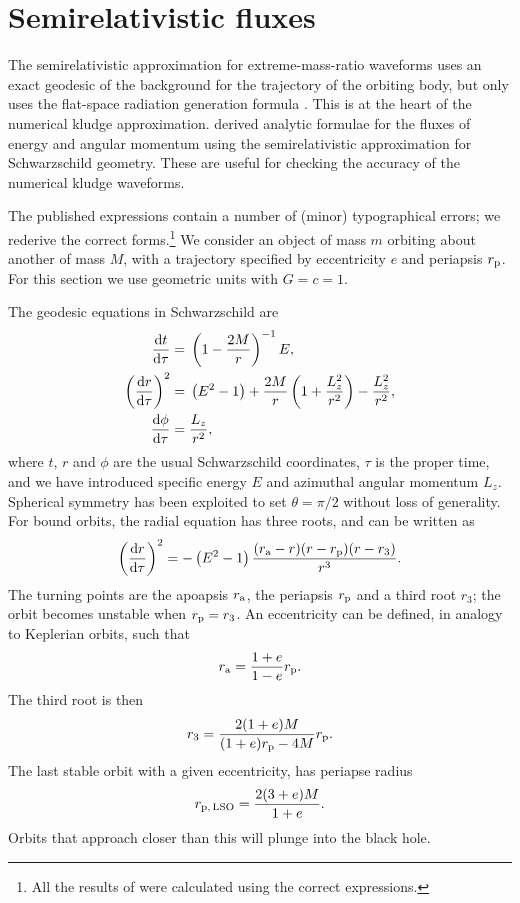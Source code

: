 \chapter{Semirelativistic fluxes}\label{ap:energy}

The semirelativistic approximation for extreme-mass-ratio waveforms uses an exact geodesic of the background for the trajectory of the orbiting body, but only uses the flat-space radiation generation formula \citep{Ruffini1981}. This is at the heart of the numerical kludge approximation. \citet{Gair2005} derived analytic formulae for the fluxes of energy and angular momentum using the semirelativistic approximation for Schwarzschild geometry. These are useful for checking the accuracy of the numerical kludge waveforms.

The published expressions contain a number of (minor) typographical errors; we rederive the correct forms.\footnote{All the results of \citet{Gair2005} were calculated using the correct expressions.} We consider an object of mass $m$ orbiting about another of mass $M$, with a trajectory specified by eccentricity $e$ and periapsis $r_\mathrm{p}$. For this section we use geometric units with $G = c = 1$.

The geodesic equations in Schwarzschild are
\begin{subequations}
\begin{align}
\dfrac{\mathrm{d} {t}}{\mathrm{d} {\tau}} = {} & \left(1-\dfrac{2M}{r}\right)^{-1}E, \\
\left(\dfrac{\mathrm{d} {r}}{\mathrm{d} {\tau}}\right)^2 = {} & \left(E^2 - 1\right) + \dfrac{2M}{r}\left(1 + \dfrac{L_z^2}{r^2}\right) - \dfrac{L_z^2}{r^2}, \\
\dfrac{\mathrm{d} {\phi}}{\mathrm{d} {\tau}} = {} & \dfrac{L_z}{r^2},
\end{align}
\end{subequations}
where $t$, $r$ and $\phi$ are the usual Schwarzschild coordinates, $\tau$ is the proper time, and we have introduced specific energy $E$ and azimuthal angular momentum $L_z$. Spherical symmetry has been exploited to set $\theta = \pi/2$ without loss of generality. For bound orbits, the radial equation has three roots, and can be written as
\begin{equation}
\left(\dfrac{\mathrm{d} {r}}{\mathrm{d} {\tau}}\right)^2 = -\left(E^2 - 1\right)\dfrac{(r_\mathrm{a} - r)(r - r_\mathrm{p})(r - r_3)}{r^3}.
\end{equation}
The turning points are the apoapsis $r_\mathrm{a}$, the periapsis $r_\mathrm{p}$ and a third root $r_3$; the orbit becomes unstable when $r_\mathrm{p} = r_3$. An eccentricity can be defined, in analogy to Keplerian orbits, such that
\begin{equation}
r_\mathrm{a} = \dfrac{1 + e}{1 - e}r_\mathrm{p}.
\end{equation}
The third root is then
\begin{equation}
r_3 = \dfrac{2(1 + e)M}{(1+e)r_\mathrm{p} - 4M}r_\mathrm{p}.
\end{equation}
The last stable orbit with a given eccentricity, has periapse radius
\begin{equation}
r_\mathrm{p,\,LSO} = \dfrac{2(3 + e)M}{1+e}.
\end{equation}
Orbits that approach closer than this will plunge into the black hole.


